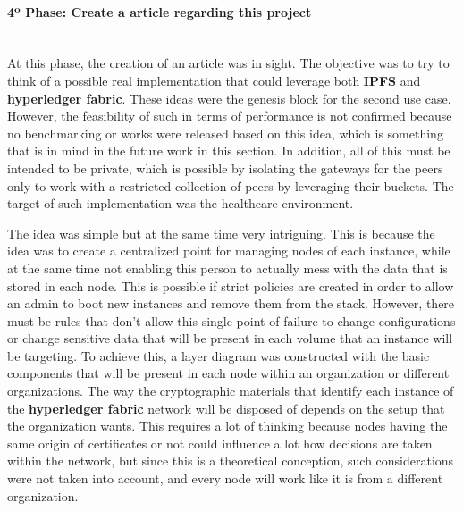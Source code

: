 \paragraph{4º Phase: Create a article regarding this project}\mbox{}\\
At this phase, the creation of an article was in sight. The objective was to try to think of a possible real implementation that could leverage both \textbf{IPFS} and \textbf{hyperledger fabric}. These ideas were the genesis block for the second use case. However, the feasibility of such in terms of performance is not confirmed because no benchmarking or works were released based on this idea, which is something that is in mind in the future work in this section. In addition, all of this must be intended to be private, which is possible by isolating the gateways for the peers only to work with a restricted collection of peers by leveraging their buckets. The target of such implementation was the healthcare environment.

The idea was simple but at the same time very intriguing. This is because the idea was to create a centralized point for managing nodes of each instance, while at the same time not enabling this person to actually mess with the data that is stored in each node. This is possible if strict policies are created in order to allow an admin to boot new instances and remove them from the stack. However, there must be rules that don't allow this single point of failure to change configurations or change sensitive data that will be present in each volume that an instance will be targeting. To achieve this, a layer diagram was constructed with the basic components that will be present in each node within an organization or different organizations. The way the cryptographic materials that identify each instance of the \textbf{hyperledger fabric} network will be disposed of depends on the setup that the organization wants. This requires a lot of thinking because nodes having the same origin of certificates or not could influence a lot how decisions are taken within the network, but since this is a theoretical conception, such considerations were not taken into account, and every node will work like it is from a different organization.

